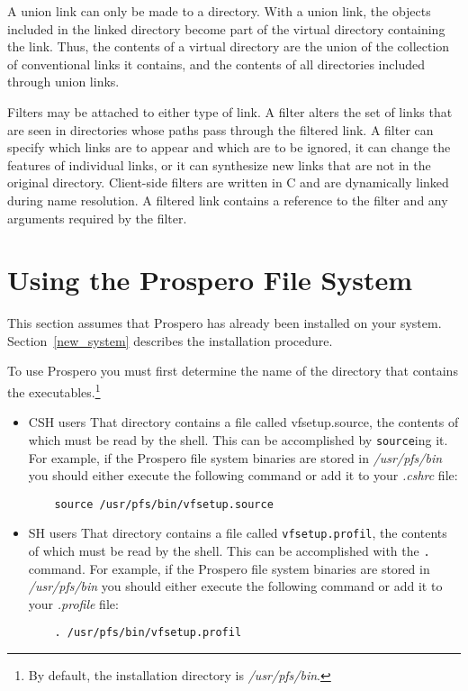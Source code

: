 A union link can only be made to a directory.  With a union link, the
objects included in the linked directory become part of the virtual
directory containing the link.  Thus, the contents of a virtual
directory are the union of the collection of conventional links it
contains, and the contents of all directories included through union
links.

Filters may be attached to either type of link.  A filter alters the
set of links that are seen in directories whose paths pass through the
filtered link.  A filter can specify which links are to appear and
which are to be ignored, it can change the features of individual
links, or it can synthesize new links that are not in the original
directory.  Client-side filters are written in C and are dynamically
linked during name resolution.  A filtered link contains a reference
to the filter and any arguments required by the filter.

\section{Using the Prospero File System}

This section assumes that Prospero has already been installed on your
system.  Section~\ref{new_system} describes the installation
procedure.

To use Prospero you must first determine the name of the directory
that contains the executables.\footnote{By default, the installation
directory is {\it /usr/pfs/bin}.} 
\begin{itemize}
\item{CSH users}  That directory
contains a file called vfsetup.source, the contents of which must be
read by the shell.  This can be accomplished by {\tt source}ing it.
For example, if the Prospero file system binaries are stored in {\it
/usr/pfs/bin} you should either execute the following command or add
it to your {\it .cshrc} file:

\begin{verbatim}
    source /usr/pfs/bin/vfsetup.source
\end{verbatim}

\item{SH users}  That directory
contains a file called {\tt vfsetup.profil}, the contents of which must be
read by the shell.  This can be accomplished with the {\tt .} command.
For example, if the Prospero file system binaries are stored in {\it
/usr/pfs/bin} you should either execute the following command or add
it to your {\it .profile} file:

\begin{verbatim}
    . /usr/pfs/bin/vfsetup.profil
\end{verbatim}

\end{itemize}

